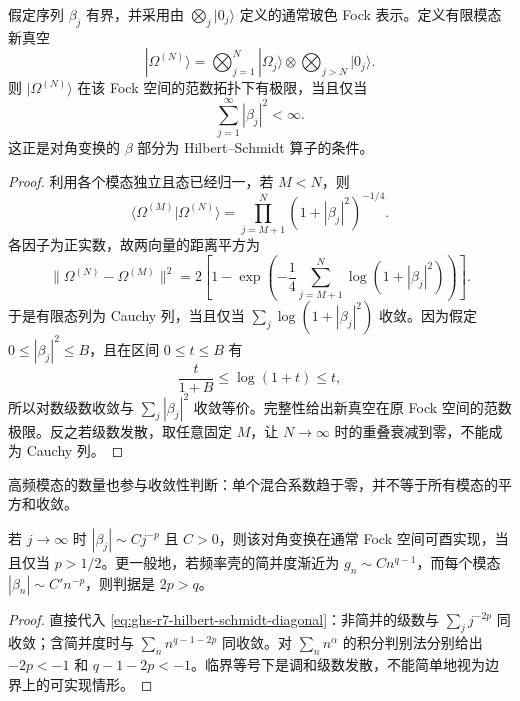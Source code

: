 \begin{theorem}[对角无限模态压缩的酉实现条件]\label{thm:ghs-r7-diagonal-shale}
假定序列 $\beta_j$ 有界，并采用由 $\bigotimes_j|0_j\rangle$ 定义的通常玻色 Fock 表示。定义有限模态新真空
\[
 |\Omega^{(N)}\rangle=
 \bigotimes_{j=1}^N|\Omega_j\rangle
 \otimes\bigotimes_{j>N}|0_j\rangle.
\]
则 $|\Omega^{(N)}\rangle$ 在该 Fock 空间的范数拓扑下有极限，当且仅当
\begin{equation}\label{eq:ghs-r7-hilbert-schmidt-diagonal}
 \sum_{j=1}^\infty|\beta_j|^2<\infty.
\end{equation}
这正是对角变换的 $\beta$ 部分为 Hilbert--Schmidt 算子的条件。
\end{theorem}
\begin{proof}
利用各个模态独立且态已经归一，若 $M<N$，则
\begin{equation}\label{eq:ghs-r7-partial-vacuum-innerproduct}
 \langle\Omega^{(M)}|\Omega^{(N)}\rangle
 =\prod_{j=M+1}^N(1+|\beta_j|^2)^{-1/4}.
\end{equation}
各因子为正实数，故两向量的距离平方为
\[
 \|\Omega^{(N)}-\Omega^{(M)}\|^2
 =2\left[1-\exp\left(-\frac14
 \sum_{j=M+1}^N\log(1+|\beta_j|^2)\right)\right].
\]
于是有限态列为 Cauchy 列，当且仅当 $\sum_j\log(1+|\beta_j|^2)$ 收敛。因为假定 $0\le|\beta_j|^2\le B$，且在区间 $0\le t\le B$ 有
\[
 \frac{t}{1+B}\le\log(1+t)\le t,
\]
所以对数级数收敛与 $\sum_j|\beta_j|^2$ 收敛等价。完整性给出新真空在原 Fock 空间的范数极限。反之若级数发散，取任意固定 $M$，让 $N\to\infty$ 时的重叠衰减到零，不能成为 Cauchy 列。
\end{proof}



高频模态的数量也参与收敛性判断：单个混合系数趋于零，并不等于所有模态的平方和收敛。

\begin{proposition}[高频谱尾的酉实现阈值]
\label{prop:ghs-r7-shale-power-count}
若 $j\to\infty$ 时 $|\beta_j|\sim Cj^{-p}$ 且 $C>0$，则该对角变换在通常 Fock 空间可酉实现，当且仅当 $p>1/2$。更一般地，若频率壳的简并度渐近为 $g_n\sim Cn^{q-1}$，而每个模态 $|\beta_n|\sim C'n^{-p}$，则判据是 $2p>q$。
\end{proposition}

\begin{proof}
直接代入 \cref{eq:ghs-r7-hilbert-schmidt-diagonal}：非简并的级数与 $\sum_jj^{-2p}$ 同收敛；含简并度时与 $\sum_n n^{q-1-2p}$ 同收敛。对 $\sum_n n^{\alpha}$ 的积分判别法分别给出 $-2p<-1$ 和 $q-1-2p<-1$。临界等号下是调和级数发散，不能简单地视为边界上的可实现情形。
\end{proof}

